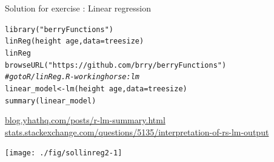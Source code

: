 \documentclass[xcolor=table,       handout,    xcolor=dvipsnames]{beamer}\usepackage[]{graphicx}\usepackage[]{color}
\makeatletter
\newcommand{\hlstr}[1]{\textcolor[rgb]{0.545,0.137,0.137}{#1}}
\newcommand{\hlcom}[1]{\textcolor[rgb]{0,0.392,0}{\textit{#1}}}
\newcommand{\hlopt}[1]{\textcolor[rgb]{0,0,0}{#1}}
\newcommand{\hlstd}[1]{\textcolor[rgb]{0,0,0}{#1}}
\newcommand{\hlkwb}[1]{\textcolor[rgb]{0,0,0}{#1}}
\newcommand{\hlkwc}[1]{\textcolor[rgb]{1,0,1}{#1}}
\newcommand{\hlkwd}[1]{\textcolor[rgb]{0,0,1}{#1}}
\newenvironment{kframe}{%
 \def\at@end@of@kframe{}%
 \ifinner\ifhmode%
  \def\at@end@of@kframe{\end{minipage}}%
  \begin{minipage}{\columnwidth}%
 \fi\fi%
 \def\FrameCommand##1{\hskip\@totalleftmargin \hskip-\fboxsep
 \colorbox{shadecolor}{##1}\hskip-\fboxsep
     \hskip-\linewidth \hskip-\@totalleftmargin \hskip\columnwidth}%
 \MakeFramed {\advance\hsize-\width
   \@totalleftmargin\z@ \linewidth\hsize
   \@setminipage}}%
 {\par\unskip\endMakeFramed%
 \at@end@of@kframe}
\newenvironment{knitrout}{}{} %
\newcounter{exercisecount}
\makeatother
\begin{document}

\begin{frame}[fragile]{Solution for exercise : Linear regression}
\vspace{-1em}
\begin{knitrout}\footnotesize
{}\color{fgcolor}\begin{kframe}
\begin{alltt}
\hlkwd{library}\hlstd{(}\hlstr{"berryFunctions"}\hlstd{)}
\hlkwd{linReg}\hlstd{(height}\hlopt{~}\hlstd{age,} \hlkwc{data}\hlstd{=treesize)}
\hlstd{linReg}
\hlkwd{browseURL}\hlstd{(}\hlstr{"https://github.com/brry/berryFunctions"}\hlstd{)}
\hlcom{# go to R/linReg.R  -  working horse: lm}
\hlstd{linear_model} \hlkwb{<-} \hlkwd{lm}\hlstd{(height}\hlopt{~}\hlstd{age,} \hlkwc{data}\hlstd{=treesize)}
\hlkwd{summary}\hlstd{(linear_model)}
\end{alltt}
\end{kframe}
\end{knitrout}
\vspace{-1em}
\small
\href{http://blog.yhathq.com/posts/r-lm-summary.html}{blog.yhathq.com/posts/r-lm-summary.html}\\
\href{http://stats.stackexchange.com/questions/5135/interpretation-of-rs-lm-output}{stats.stackexchange.com/questions/5135/interpretation-of-rs-lm-output}
\normalsize
\begin{knitrout}
\color{fgcolor}

{\centering \texttt{[image: ./fig/sollinreg2-1]} 

}



\end{knitrout}
\end{frame}
\end{document}
